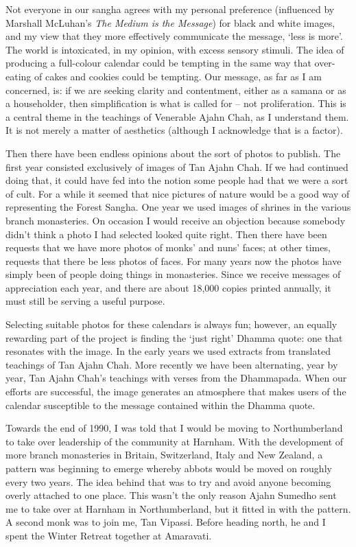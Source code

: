 Not everyone in our sangha agrees with my personal preference
(influenced by Marshall McLuhan's \emph{The Medium is the Message}) for
black and white images, and my view that they more effectively
communicate the message, `less is more'. The world is intoxicated, in my
opinion, with excess sensory stimuli. The idea of producing a
full-colour calendar could be tempting in the same way that over-eating
of cakes and cookies could be tempting. Our message, as far as I am
concerned, is: if we are seeking clarity and contentment, either as a
samana or as a householder, then simplification is what is called for --
not proliferation. This is a central theme in the teachings of Venerable Ajahn Chah,
as I understand them. It is not merely a matter of aesthetics (although
I acknowledge that is a factor).

Then there have been endless opinions about the sort of photos to
publish. The first year consisted exclusively of images of Tan Ajahn
Chah. If we had continued doing that, it could have fed into the notion
some people had that we were a sort of cult. For a while it seemed that
nice pictures of nature would be a good way of representing the Forest
Sangha. One year we used images of shrines in the various branch
monasteries. On occasion I would receive an objection because somebody
didn't think a photo I had selected looked quite right. Then there have
been requests that we have more photos of monks' and nuns' faces; at
other times, requests that there be less photos of faces. For many years
now the photos have simply been of people doing things in monasteries.
Since we receive messages of appreciation each year, and there are about
18,000 copies printed annually, it must still be serving a useful
purpose.

Selecting suitable photos for these calendars is always fun; however, an
equally rewarding part of the project is finding the `just right' Dhamma
quote: one that resonates with the image. In the early years we used
extracts from translated teachings of Tan Ajahn Chah. More recently we
have been alternating, year by year, Tan Ajahn Chah's teachings with
verses from the Dhammapada. When our efforts are successful, the image
generates an atmosphere that makes users of the calendar susceptible to
the message contained within the Dhamma quote.

Towards the end of 1990, I was told that I would be moving to
Northumberland to take over leadership of the community at Harnham. With
the development of more branch monasteries in Britain, Switzerland,
Italy and New Zealand, a pattern was beginning to emerge whereby abbots
would be moved on roughly every two years. The idea behind that was to
try and avoid anyone becoming overly attached to one place. This wasn't
the only reason Ajahn Sumedho sent me to take over at Harnham in
Northumberland, but it fitted in with the pattern. A second monk was to
join me, Tan Vipassi. Before heading north, he and I spent the Winter
Retreat together at Amaravati.

